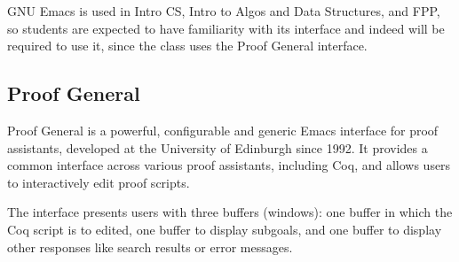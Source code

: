 GNU Emacs is used in Intro CS, Intro to Algos and Data Structures, and FPP, so students are expected to have familiarity with its interface and indeed will be required to use it, since the class uses the Proof General interface.


\subsection{Proof General}
Proof General is a powerful, configurable and generic Emacs interface for proof assistants, developed at the University of Edinburgh since 1992. It provides a common interface across various proof assistants, including Coq, and allows users to interactively edit proof scripts.

The interface presents users with three buffers (windows): one buffer in which the Coq script is to edited, one buffer to display subgoals, and one buffer to display other responses like search results or error messages.